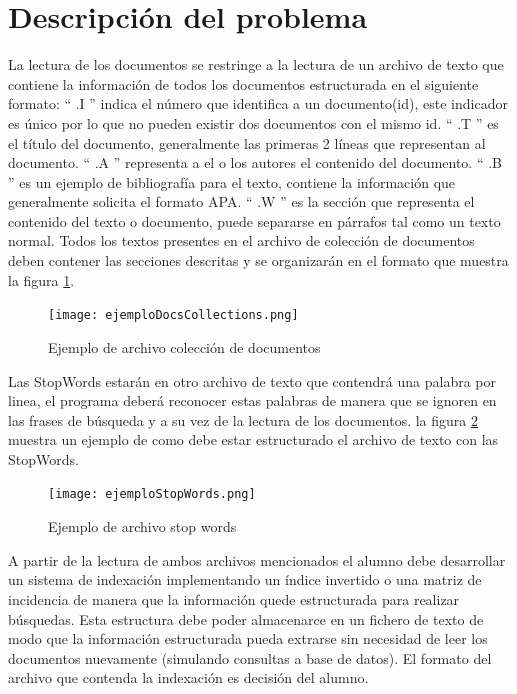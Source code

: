 \documentclass[letterpaper,12pt]{report}
\begin{document}
\section {Descripci\'on del problema}

La lectura de los documentos se restringe a la lectura de un archivo de texto que contiene la información de todos los documentos estructurada en el siguiente formato: `` .I '' indica el número que identifica a un documento(id), este indicador es único por lo que no pueden existir dos documentos con el mismo id. `` .T '' es el título del documento, generalmente las primeras 2 líneas que representan al documento. `` .A '' representa a el o los autores el contenido del documento. `` .B '' es un ejemplo de bibliografía para el texto, contiene la información que generalmente solicita el formato APA. `` .W '' es la sección que representa el contenido del texto o documento, puede separarse en párrafos tal como un texto normal. Todos los textos presentes en el archivo de colección de documentos deben contener las secciones descritas y se organizarán en el formato que muestra la figura \ref{fig:ejemploDocsCollections}.


\begin{figure}[H]
    \centering
    \texttt{[image: ejemploDocsCollections.png]}
    \caption{Ejemplo de archivo colección de documentos}
    \label{fig:ejemploDocsCollections}
\end{figure}

\vspace{5cm}

Las StopWords estarán en otro archivo de texto que contendrá una palabra por linea, el programa deberá reconocer estas palabras de manera que se ignoren en las frases de búsqueda y a su vez de la lectura de los documentos. la figura \ref{fig:ejemploStopWords} muestra un ejemplo de como debe estar estructurado el archivo de texto con las StopWords.

\begin{figure}[H]
    \centering
    \texttt{[image: ejemploStopWords.png]}
    \caption{Ejemplo de archivo stop words}
    \label{fig:ejemploStopWords}
\end{figure}

A partir de la lectura de ambos archivos mencionados el alumno debe desarrollar un sistema de indexación implementando un índice invertido o una matriz de incidencia de manera que la información quede estructurada para realizar búsquedas. Esta estructura debe poder almacenarce en un fichero de texto de modo que la información estructurada pueda extrarse sin necesidad de leer los documentos nuevamente (simulando consultas a base de datos). El formato del archivo que contenda la indexación es decisión del alumno.
\end{document}
